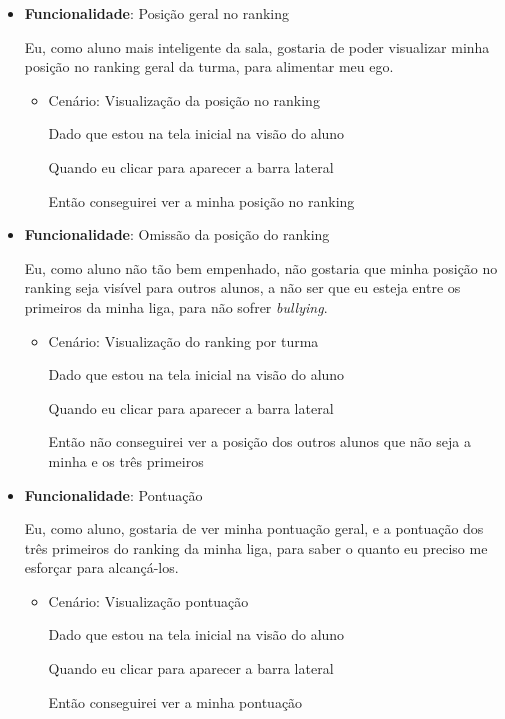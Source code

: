 \begin{itemize}
\item\textbf{Funcionalidade}: Posição geral no \gls{ranking}
    
    Eu, como aluno mais inteligente da sala, gostaria de poder visualizar minha posição no \gls{ranking} geral da turma, para alimentar meu ego.
    \begin{itemize}
        \item Cenário: Visualização da posição no \gls{ranking}
        \par Dado que estou na tela inicial na visão do aluno
        \par Quando eu clicar para aparecer a barra lateral
        \par Então conseguirei ver a minha posição no \gls{ranking}
    \end{itemize}  

\item\textbf{Funcionalidade}: Omissão da posição do \gls{ranking}
    
    Eu, como aluno não tão bem empenhado, não gostaria que minha posição no \gls{ranking} seja visível para outros alunos, a não ser que eu esteja entre os primeiros da minha liga, para não sofrer \textit{bullying}.
    \begin{itemize}
        \item Cenário: Visualização do \gls{ranking} por turma
        \par Dado que estou na tela inicial na visão do aluno
        \par Quando eu clicar para aparecer a barra lateral
        \par Então não conseguirei ver a posição dos outros alunos que não seja a minha e os três primeiros
    \end{itemize}  

\item\textbf{Funcionalidade}: Pontuação
    
    Eu, como aluno, gostaria de ver minha pontuação geral, e a pontuação dos três primeiros do \gls{ranking} da minha liga, para saber o quanto eu preciso me esforçar para alcançá-los.
    \begin{itemize}
        \item Cenário: Visualização pontuação
        \par Dado que estou na tela inicial na visão do aluno
        \par Quando eu clicar para aparecer a barra lateral
        \par Então conseguirei ver a minha pontuação
    \end{itemize}  
 

\end{itemize}
